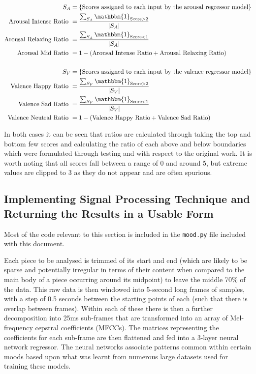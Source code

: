 \documentclass[12pt,]{article}
\begin{document}
\[\begin{aligned}
S_A &= \{\text{Scores assigned to each input by the arousal regressor model}\} \\
\text{Arousal Intense Ratio } &= \frac{\sum_{S_A} \mathbbm{1}_{\text{Score}> 2}}{|S_A|} \\
\text{Arousal Relaxing Ratio } &= \frac{\sum_{S_A} \mathbbm{1}_{\text{Score}< 1}}{|S_A|} \\
\text{Arousal Mid Ratio } &= 1 - (\text{Arousal Intense Ratio} + \text{Arousal Relaxing Ratio}) \\ \\
S_V &= \{\text{Scores assigned to each input by the valence regressor model}\} \\
\text{Valence Happy Ratio } &= \frac{\sum_{S_V} \mathbbm{1}_{\text{Score}> 2}}{|S_V|} \\
\text{Valence Sad Ratio } &= \frac{\sum_{S_V} \mathbbm{1}_{\text{Score}< 1}}{|S_V|} \\
\text{Valence Neutral Ratio } &= 1 - (\text{Valence Happy Ratio} + \text{Valence Sad Ratio}) \\
\end{aligned}\]

In both cases it can be seen that ratios are calculated through taking
the top and bottom few scores and calculating the ratio of each above
and below boundaries which were formulated through testing and with
respect to the original work. It is worth noting that all scores fall
between a range of 0 and around 5, but extreme values are clipped to 3
as they do not appear and are often spurious.

\hypertarget{implementing-signal-processing-technique-and-returning-the-results-in-a-usable-form}{%
\subsection{Implementing Signal Processing Technique and Returning the
Results in a Usable
Form}\label{implementing-signal-processing-technique-and-returning-the-results-in-a-usable-form}}

Most of the code relevant to this section is included in the
\texttt{mood.py} file included with this document.

Each piece to be analysed is trimmed of its start and end (which are
likely to be sparse and potentially irregular in terms of their content
when compared to the main body of a piece occurring around its midpoint)
to leave the middle 70\% of the data. This raw data is then windowed
into 5-second long frames of samples, with a step of 0.5 seconds between
the starting points of each (such that there is overlap between frames).
Within each of these there is then a further decomposition into 25ms
sub-frames that are transformed into an array of Mel-frequency cepstral
coefficients (MFCCs). The matrices representing the coefficients for
each sub-frame are then flattened and fed into a 3-layer neural network
regressor. The neural networks associate patterns common within certain
moods based upon what was learnt from numerous large datasets used for
training these models.
\end{document}

